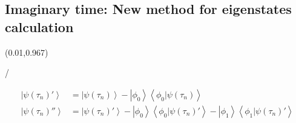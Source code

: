 \documentclass{beamer}
\makeatletter
\newcommand{\framenumber}{
\begin{textblock}{0}(0.01,0.967)
\begin{scriptsize}
{\color{gray}\insertframenumber/\inserttotalframenumber}
\end{scriptsize}
\end{textblock}
}
\newcommand{\pa}[1]{\left( #1 \right)}
\newcommand{\ket}[1]{\left| #1 \right>}
\newcommand{\crossp}[2]{\left< #1 \left| #2 \right.\right>}
\makeatother
\begin{document}
\subsection{Imaginary time: New method for eigenstates calculation}
\begin{frame}{}\framenumber
\begin{center}
\begin{align}
\ket{ \psi\pa{\tau_n}' } & = \ket{ \psi\pa{\tau_n} }
                        - \ket{\phi_0} \crossp{\phi_0}{\psi\pa{\tau_n}} \\
\ket{ \psi\pa{\tau_n}'' } & = \ket{ \psi\pa{\tau_n}' }
                        - \ket{\phi_0} \crossp{\phi_0}{\psi\pa{\tau_n}'}
                        - \ket{\phi_1} \crossp{\phi_1}{\psi\pa{\tau_n}'}
\end{align}
\end{center}
\end{frame}
\end{document}

